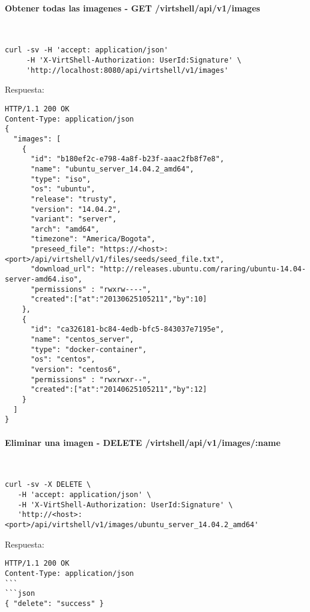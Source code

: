 \paragraph{Obtener todas las imagenes - GET /virtshell/api/v1/images} ~\\

\begin{lstlisting}[style=json]
curl -sv -H 'accept: application/json' 
     -H 'X-VirtShell-Authorization: UserId:Signature' \ 
     'http://localhost:8080/api/virtshell/v1/images'
\end{lstlisting}

\vspace{1cm}
Respuesta:
\vspace{1cm}

\begin{lstlisting}[style=json]
HTTP/1.1 200 OK
Content-Type: application/json
{
  "images": [
    {
      "id": "b180ef2c-e798-4a8f-b23f-aaac2fb8f7e8",
      "name": "ubuntu_server_14.04.2_amd64",
      "type": "iso",
      "os": "ubuntu", 
      "release": "trusty",
      "version": "14.04.2", 
      "variant": "server", 
      "arch": "amd64", 
      "timezone": "America/Bogota", 
      "preseed_file": "https://<host>:<port>/api/virtshell/v1/files/seeds/seed_file.txt",
      "download_url": "http://releases.ubuntu.com/raring/ubuntu-14.04-server-amd64.iso",
      "permissions" : "rwxrw----",
      "created":["at":"20130625105211","by":10]
    },
    {
      "id": "ca326181-bc84-4edb-bfc5-843037e7195e",
      "name": "centos_server",
      "type": "docker-container",
      "os": "centos", 
      "version": "centos6", 
      "permissions" : "rwxrwxr--",
      "created":["at":"20140625105211","by":12]
    }
  ]
}  
\end{lstlisting}

\paragraph{Eliminar una imagen - DELETE /virtshell/api/v1/images/:name} ~\\

\begin{lstlisting}[style=json]
curl -sv -X DELETE \
   -H 'accept: application/json' \
   -H 'X-VirtShell-Authorization: UserId:Signature' \
   'http://<host>:<port>/api/virtshell/v1/images/ubuntu_server_14.04.2_amd64'
\end{lstlisting}

\vspace{1cm}
Respuesta:
\vspace{1cm}

\begin{lstlisting}[style=json]
HTTP/1.1 200 OK
Content-Type: application/json
```
```json
{ "delete": "success" }
\end{lstlisting}
